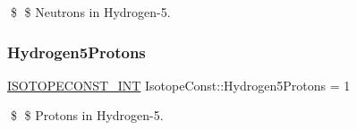 \$ \$ Neutrons in Hydrogen-\/5. \mbox{\label{group___isotope_const-_hydrogen-_h5_ga33e9d2d41a1c32fce3a8e0b5936631a2}} 
\subsubsection{\texorpdfstring{Hydrogen5\+Protons}{Hydrogen5Protons}}
{\footnotesize\ttfamily \mbox{\hyperlink{group___isotope_const-_macros_ga5f18360b3e99483a35c32d789e62621c}{I\+S\+O\+T\+O\+P\+E\+C\+O\+N\+S\+T\+\_\+\+I\+NT}} Isotope\+Const\+::\+Hydrogen5\+Protons = 1}

\$ \$ Protons in Hydrogen-\/5. 